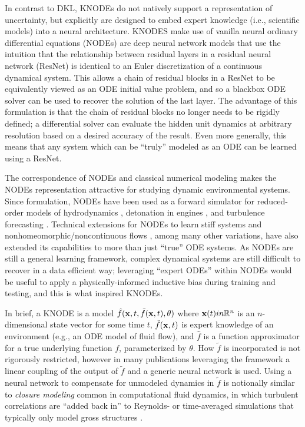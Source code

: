 In contrast to DKL, KNODEs do not natively support a representation of uncertainty, but explicitly are designed to embed expert knowledge (i.e., scientific models) into a neural architecture. KNODES make use of vanilla neural ordinary differential equations \autocite{chen2018neural} (NODEs) are deep neural network models that use the intuition that the relationship between residual layers in a residual neural network (ResNet) is identical to an Euler discretization of a continuous dynamical system. This allows a chain of residual blocks in a ResNet to be equivalently viewed as an ODE initial value problem, and so a blackbox ODE solver can be used to recover the solution of the last layer. The advantage of this formulation is that the chain of residual blocks no longer needs to be rigidly defined; a differential solver can evaluate the hidden unit dynamics at arbitrary resolution based on a desired accuracy of the result. Even more generally, this means that any system which can be ``truly'' modeled as an ODE can be learned using a ResNet.

The correspondence of NODEs and classical numerical modeling makes the NODEs representation attractive for studying dynamic environmental systems. Since formulation, NODEs have been used as a forward simulator for reduced-order models of hydrodynamics \autocite{dutta2021data}, detonation in engines \autocite{koch2021data}, and turbulence forecasting \autocite{portwood2019turbulence,shankar2020learning}. Technical extensions for NODEs to learn stiff systems \autocite{kim2021stiff} and nonhomeomorphic/noncontinuous flows \autocite{dupont2019augmented}, among many other variations, have also extended its capabilities to more than just ``true'' ODE systems. As NODEs are still a general learning framework, complex dynamical systems are still difficult to recover in a data efficient way; leveraging ``expert ODEs'' within NODEs would be useful to apply a physically-informed inductive bias during training and testing, and this is what inspired KNODEs.

In brief, a KNODE is a model $\hat{f}(\mathbf{x}, t, \tilde{f}(\mathbf{x}, t), \theta)$ where $\mathbf{x}(t) in \mathbb{R}^n$ is an $n$-dimensional state vector for some time $t$, $\tilde{f}(\mathbf{x}, t)$ is expert knowledge of an environment (e.g., an ODE model of fluid flow), and $\hat{f}$ is a function approximator for a true underlying function $f$, parameterized by $\theta$. How $\tilde{f}$ is incorporated is not rigorously restricted, however in many publications leveraging the framework a linear coupling of the output of $\tilde{f}$ and a generic neural network is used. Using a neural network to compensate for unmodeled dynamics in $\tilde{f}$ is notionally similar to \emph{closure modeling} common in computational fluid dynamics, in which turbulent correlations are ``added back in'' to Reynolds- or time-averaged simulations that typically only model gross structures \autocite{durbin2018some}.

